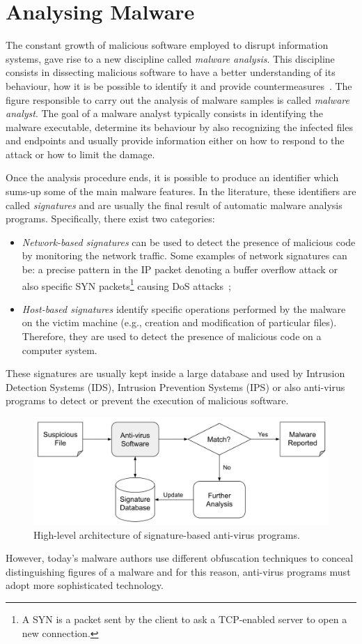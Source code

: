 \documentclass[LaM,binding=0.6cm]{sapthesis}
\begin{document}
\newpage
\section{Analysing Malware}
The constant growth of malicious software employed to disrupt information systems, gave rise to a new discipline called \textit{malware analysis}. This discipline consists in dissecting malicious software to have a better understanding of its behaviour, how it is be possible to identify it and provide countermeasures~\cite{sikorski2012practical}. The figure responsible to carry out the analysis of malware samples is called \textit{malware analyst}. The goal of a malware analyst typically consists in identifying the malware executable, determine its behaviour by also recognizing the infected files and endpoints and usually provide information either on how to respond to the attack or how to limit the damage.

Once the analysis procedure ends, it is possible to produce an identifier which sums-up some of the main malware features. In the literature, these identifiers are called \textit{signatures} and are usually the final result of automatic malware analysis programs. Specifically, there exist two categories:
\begin{itemize}
\item \textit{Network-based signatures} can be used to detect the presence of malicious code by monitoring the network traffic. Some examples of network signatures can be: a precise pattern in the IP packet denoting a buffer overflow attack or also specific SYN packets\footnote{A SYN is a packet sent by the client to ask a TCP-enabled server to open a new connection.} causing DoS attacks~\cite{fuchsberger2005intrusion};
\item \textit{Host-based signatures} identify specific operations performed by the malware on the victim machine (e.g., creation and modification of particular files). Therefore, they are used to detect the presence of malicious code on a computer system.
\end{itemize}
These signatures are usually kept inside a large database and used by Intrusion Detection Systems (IDS), Intrusion Prevention Systems (IPS) or also anti-virus programs to detect or prevent the execution of malicious software. 
\begin{figure}[h!]
\centering
\includegraphics[scale=.5]{images/background2}
\caption{High-level architecture of signature-based anti-virus programs.}
\end{figure}
\newpage
\noindent
However, today's malware authors use different obfuscation techniques to conceal distinguishing figures of a malware and for this reason, anti-virus programs must adopt more 
sophisticated technology.\\
\end{document}
